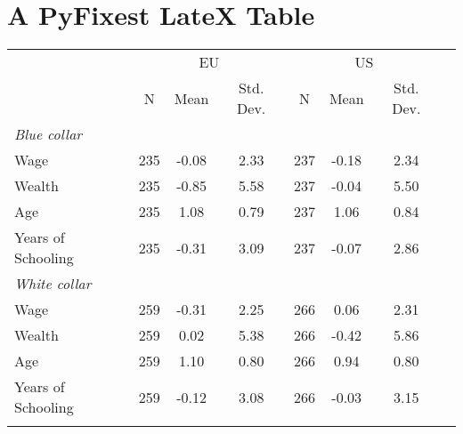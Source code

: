 \documentclass{article}%
\begin{document}
%
\normalsize%
\section{A PyFixest LateX Table}%
\label{sec:APyFixestLateXTable}%


\begin{table}[htbp]%
\renewcommand\cellalign{t}
\begin{threeparttable}
\begin{tabular}{lccccccc}
\toprule
 & \multicolumn{3}{c}{EU} & \multicolumn{3}{c}{US} \\
\cmidrule(lr){2-4} \cmidrule(lr){5-7} 
 & N & Mean & Std. Dev. & N & Mean & Std. Dev. \\
\midrule
\addlinespace
\emph{Blue collar} \\
\addlinespace
Wage & 235 & -0.08 & 2.33 & 237 & -0.18 & 2.34 \\
Wealth & 235 & -0.85 & 5.58 & 237 & -0.04 & 5.50 \\
Age & 235 & 1.08 & 0.79 & 237 & 1.06 & 0.84 \\
Years of Schooling & 235 & -0.31 & 3.09 & 237 & -0.07 & 2.86 \\
\addlinespace
\midrule
\addlinespace
\emph{White collar} \\
\addlinespace
Wage & 259 & -0.31 & 2.25 & 266 & 0.06 & 2.31 \\
Wealth & 259 & 0.02 & 5.38 & 266 & -0.42 & 5.86 \\
Age & 259 & 1.10 & 0.80 & 266 & 0.94 & 0.80 \\
Years of Schooling & 259 & -0.12 & 3.08 & 266 & -0.03 & 3.15 \\
\addlinespace
\bottomrule
\end{tabular}
\footnotesize 
\end{threeparttable}%
\end{table}

%
\end{document}
